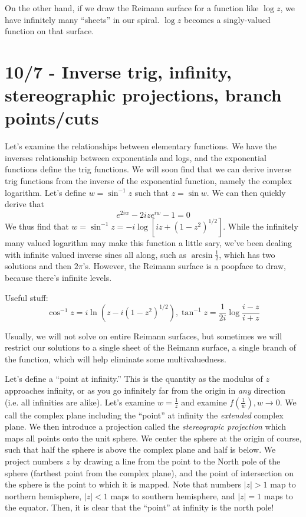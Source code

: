 \documentclass[10pt]{report}
\begin{document}
On the other hand, if we draw the Reimann surface for a function like $\log z$, we have infinitely many ``sheets'' in our spiral. $\log z$ becomes a singly-valued function on that surface. 

\chapter{10/7 - Inverse trig, infinity, stereographic projections, branch points/cuts}

Let's examine the relationships between elementary functions. We have the inverses relationship between exponentials and logs, and the exponential functions define the trig functions. We will soon find that we can derive inverse trig functions from the inverse of the exponential function, namely the complex logarithm. Let's define $w=\sin^{-1}z$ such that $z=\sin w$. We can then quickly derive that
$$e^{2iw}-2ize^{iw}-1=0$$
We thus find that $w=\sin^{-1}z=-i\log\left[ iz+\left( 1-z^2 \right)^{1/2} \right]$. While the infinitely many valued logarithm may make this function a little sary, we've been dealing with infinite valued inverse sines all along, such as $\arcsin\frac{1}{2}$, which has two solutions and then $2\pi$'s. However, the Reimann surface is a poopface to draw, because there's infinite levels.

Useful stuff:
$$\cos^{-1}z = i\ln\left( z-i(1-z^2)^{1/2} \right), \tan^{-1}z = \frac{1}{2i}\log\frac{i-z}{i+z}$$

Usually, we will not solve on entire Reimann surfaces, but sometimes we will restrict our solutions to a single sheet of the Reimann surface, a single branch of the function, which will help eliminate some multivaluedness.

Let's define a ``point at infinity.'' This is the quantity as the modulus of $z$ approaches infinity, or as you go infinitely far from the origin in \emph{any} direction (i.e. all infinities are alike). Let's examine $w=\frac{1}{z}$ and examine $f\left( \frac{1}{w} \right), w\to 0$. We call the complex plane including the ``point'' at infinity the \emph{extended} complex plane. We then introduce a projection called the \emph{stereograpic projection} which maps all points onto the unit sphere. We center the sphere at the origin of course, such that half the sphere is above the complex plane and half is below. We project numbers $z$ by drawing a line from the point to the North pole of the sphere (farthest point from the complex plane), and the point of intersection on the sphere is the point to which it is mapped. Note that numbers $|z|>1$ map to northern hemisphere, $|z| < 1$ maps to southern hemisphere, and $|z|=1$ maps to the equator. Then, it is clear that the ``point'' at infinity is the north pole!
\end{document}
